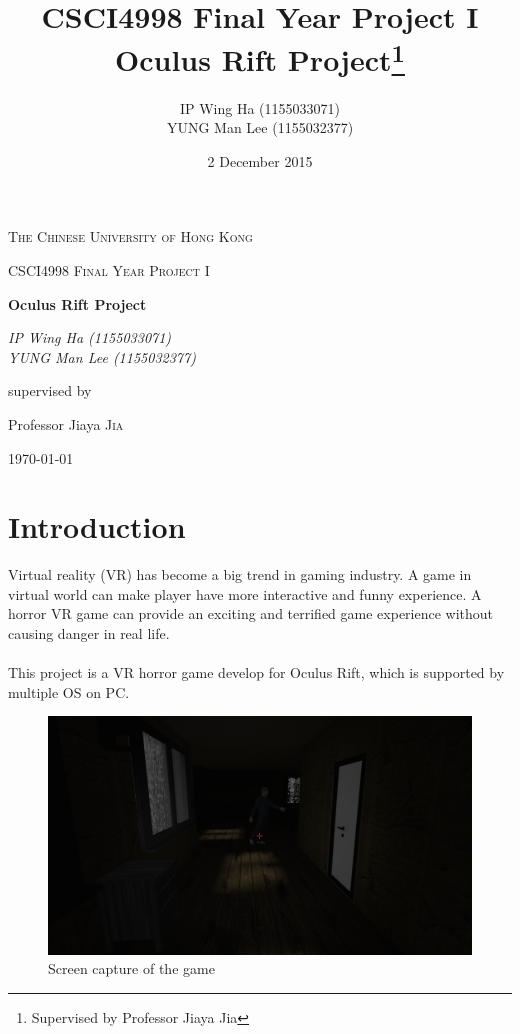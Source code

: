 \documentclass{article}
\title{CSCI4998 Final Year Project I\\Oculus Rift Project\thanks{Supervised by Professor Jiaya Jia}}
\author{IP Wing Ha (1155033071)\\YUNG Man Lee (1155032377)}
\date{2 December 2015}
\begin{document}
\begin{titlepage}
	\centering
	{\scshape\LARGE The Chinese University of Hong Kong\par}
	\vspace{1cm}
	{\scshape\Large {CSCI4998 Final Year Project I} \par}
	\vspace{1.5cm}
	{\huge\bfseries {Oculus Rift Project} \par}
	\vspace{2cm}
	{\Large\itshape IP Wing Ha (1155033071)\\YUNG Man Lee (1155032377)\par}
	\vfill
	supervised by\par
	Professor Jiaya \textsc{Jia}

	\vfill

	{\large \today\par}
\end{titlepage}

\setcounter{tocdepth}{2}
\tableofcontents

\clearpage

\section{Introduction}
Virtual reality (VR) has become a big trend in gaming industry. A game in virtual world can make player have more interactive and funny experience. A horror VR game can provide an exciting and terrified game experience without causing danger in real life.\\ \\
This project is a VR horror game develop for Oculus Rift, which is supported by multiple OS on PC.
\begin{figure}[h!]
\centering
\includegraphics[width=\textwidth]{gamecapture.png}
\caption{Screen capture of the game}
\label{fig:gamecapture}
\end{figure}
\end{document}
